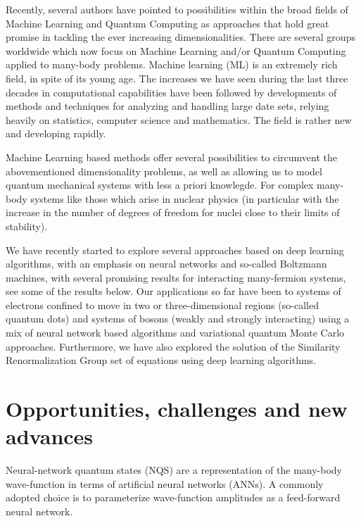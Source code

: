 \documentclass[aip,jcp,reprint,floatfix]{revtex4-1}
\begin{document}
Recently, several authors have pointed to  possibilities within the
broad fields of Machine Learning and Quantum Computing as approaches
that hold great promise in tackling the ever increasing
dimensionalities. There are several groups worldwide which now focus
on Machine Learning and/or Quantum Computing applied to many-body
problems.
Machine learning (ML) is an extremely rich field, in spite of its
young age. The increases we have seen during the last three decades in
computational capabilities have been followed by developments of
methods and techniques for analyzing and handling large date sets,
relying heavily on statistics, computer science and mathematics.  The
field is rather new and developing rapidly.

Machine Learning based methods offer several possibilities to
circumvent the abovementioned dimensionality problems, as well as
allowing us to model quantum mechanical systems with less a priori
knowlegde. For complex many-body systems like those which arise in
nuclear physics (in particular with the increase in the number of
degrees of freedom for nuclei close to their limits of stability).

We have recently started to explore several approaches based on deep
learning algorithms, with an emphasis on neural networks and so-called
Boltzmann machines, with several promising results for interacting
many-fermion systems, see some of the results below. Our applications
so far have been to systems of electrons confined to move in two or
three-dimensional regions (so-called quantum dots) and systems of
bosons (weakly and strongly interacting) using a mix of neural network
based algorithms and variational quantum Monte Carlo approaches.
Furthermore, we have also explored the solution of the Similarity
Renormalization Group set of equations using deep learning algorithms.


\section{Opportunities, challenges and new advances}

Neural-network quantum states (NQS) are a representation of the many-body
wave-function in terms of artificial neural networks (ANNs).
A commonly adopted choice is to parameterize
wave-function amplitudes as a feed-forward neural network.
\end{document}
